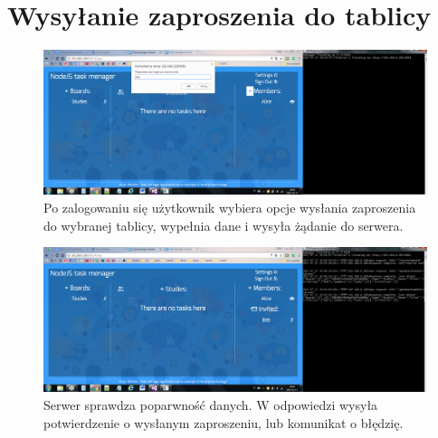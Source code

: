 \documentclass[12pt]{report}
\begin{document}
\section{Wysyłanie zaproszenia do tablicy}
\begin{figure}[!hb]
\centering
\includegraphics[width=\textwidth,height=\textheight,keepaspectratio]{01.png}
\captionsetup{labelformat=empty}
\caption[]{Po zalogowaniu się użytkownik wybiera opcje wysłania zaproszenia do wybranej tablicy, wypełnia dane i wysyła żądanie do serwera.}
\end{figure}
\begin{figure}[!hb]
\centering
\includegraphics[width=\textwidth,height=\textheight,keepaspectratio]{02.png}
\captionsetup{labelformat=empty}
\caption[]{Serwer sprawdza poparwność danych. 
W odpowiedzi wysyła potwierdzenie o wysłanym zaproszeniu, lub komunikat o błędzię.}
\end{figure}
\end{document}

